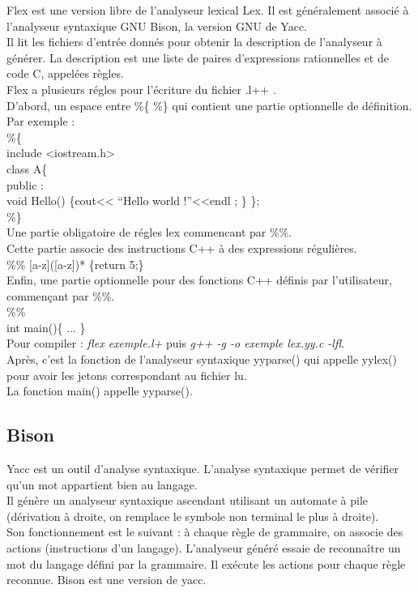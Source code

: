 Flex est une version libre de l'analyseur lexical Lex. Il est généralement associé à l'analyseur syntaxique GNU Bison, la version GNU de Yacc. \\
Il lit les fichiers d'entrée donnés pour obtenir la description de l'analyseur à générer. La description est une liste de paires d'expressions rationnelles et de code C, appelées règles. \\
Flex a plusieurs régles pour l'écriture du fichier .l++ .\\
D'abord, un espace entre \%\{ \%\} qui contient une partie optionnelle de définition.\\
Par exemple :\\
\%\{\\
include <iostream.h>\\
class A\{ \\
 public :\\
  void Hello() \{cout<< ``Hello world !''<<endl ; \}
\};\\
\%\}\\
Une partie obligatoire de régles lex commencant par \%\%.\\
Cette partie associe des instructions C++ à des expressions régulières.\\
\%\%
[a-z]([a-z])*           \{return 5;\}\\
Enfin, une partie optionnelle pour des fonctions C++ définis par l'utilisateur, commençant par \%\%.\\
\%\%\\
int main()\{
...
\}\\
Pour compiler : \textit{flex exemple.l+} puis \textit{g++ -g -o exemple lex.yy.c -lfl}.\\
Après, c'est la fonction de l'analyseur syntaxique yyparse() qui appelle yylex() pour avoir les jetons correspondant au fichier lu.\\
La fonction main() appelle yyparse().\\


\subsection{Bison}

Yacc est un outil d'analyse syntaxique. L'analyse syntaxique permet de vérifier qu'un mot appartient bien au langage.\\ Il génère un analyseur syntaxique ascendant utilisant un automate à pile (dérivation à droite, on remplace le symbole non terminal le plus à droite).\\ Son fonctionnement est le suivant : à chaque règle de grammaire, on associe des actions (instructions d'un langage). L'analyseur généré essaie de reconnaître un mot du langage défini par la grammaire. Il exécute les actions pour chaque règle reconnue.  Bison est une version de yacc.\\

